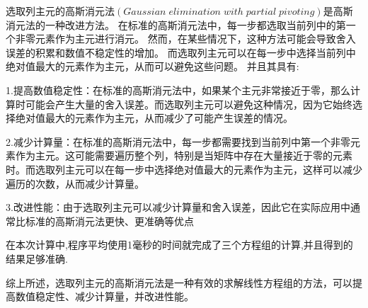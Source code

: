 \documentclass[12pt, a4paper, oneside]{ctexart}
\begin{document}
选取列主元的高斯消元法$(Gaussian\;elimination\;with\;partial\;pivoting)$是高斯消元法的一种改进方法。
在标准的高斯消元法中，每一步都选取当前列中的第一个非零元素作为主元进行消元。
然而，在某些情况下，这种方法可能会导致舍入误差的积累和数值不稳定性的增加。
而选取列主元可以在每一步中选择当前列中绝对值最大的元素作为主元，从而可以避免这些问题。
并且其具有:

1.提高数值稳定性：在标准的高斯消元法中，如果某个主元非常接近于零，那么计算时可能会产生大量的舍入误差。而选取列主元可以避免这种情况，因为它始终选择绝对值最大的元素作为主元，从而减少了可能产生误差的情况。

2.减少计算量：在标准的高斯消元法中，每一步都需要找到当前列中第一个非零元素作为主元。这可能需要遍历整个列，特别是当矩阵中存在大量接近于零的元素时。而选取列主元可以在每一步中选择绝对值最大的元素作为主元，这样可以减少遍历的次数，从而减少计算量。

3.改进性能：由于选取列主元可以减少计算量和舍入误差，因此它在实际应用中通常比标准的高斯消元法更快、更准确等优点

在本次计算中,程序平均使用1毫秒的时间就完成了三个方程组的计算,并且得到的结果足够准确.

综上所述，选取列主元的高斯消元法是一种有效的求解线性方程组的方法，可以提高数值稳定性、减少计算量，并改进性能。
\end{document}

